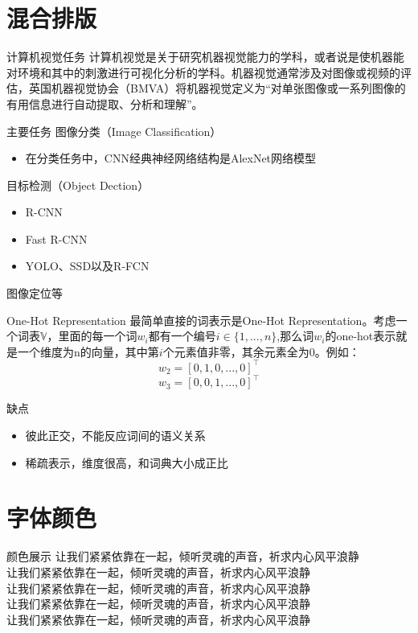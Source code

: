 \documentclass[10pt,aspectratio=43,mathserif,table]{beamer}
\begin{document}
\section{混合排版}  
\begin{frame}{计算机视觉任务}
	计算机视觉是关于研究机器视觉能力的学科，或者说是使机器能对环境和其中的刺激进行可视化分析的学科。机器视觉通常涉及对图像或视频的评估，英国机器视觉协会（BMVA）将机器视觉定义为“对单张图像或一系列图像的有用信息进行自动提取、分析和理解”。
\begin{block}{主要任务}
	图像分类（Image Classification）
	\begin{itemize}
		\item<0-> 在分类任务中，CNN经典神经网络结构是AlexNet网络模型
	\end{itemize}
	目标检测（Object Dection）
	\begin{itemize}
		\item<0-> R-CNN
		\item<0-> Fast R-CNN
		\item<0-> YOLO、SSD以及R-FCN
	\end{itemize}
	图像定位等
\end{block}
\end{frame}

\begin{frame}{One-Hot Representation}
最简单直接的词表示是One-Hot Representation。考虑一个词表$ \mathbb V $，里面的每一个词$ w_i $都有一个编号$ i\in \{1,...,n\} $,那么词$ w_i $的one-hot表示就是一个维度为n的向量，其中第$ i $个元素值非零，其余元素全为0。例如：
\[  w_2=[0,1,0,...,0]^\top  \]
\[  w_3=[0,0,1,...,0]^\top  \]
\begin{block}{缺点}
	\begin{itemize}
		\item<0-> 彼此正交，不能反应词间的语义关系
		\item<0-> 稀疏表示，维度很高，和词典大小成正比
	\end{itemize}
\end{block}
\end{frame}

\section{字体颜色}
\begin{frame}{颜色展示}
	\textcolor{mygray}{让我们紧紧依靠在一起，倾听灵魂的声音，祈求内心风平浪静}\\
	\textcolor{mygreen}{让我们紧紧依靠在一起，倾听灵魂的声音，祈求内心风平浪静}\\
	\textcolor{mypink}{让我们紧紧依靠在一起，倾听灵魂的声音，祈求内心风平浪静}\\
	\textcolor{mycyan}{让我们紧紧依靠在一起，倾听灵魂的声音，祈求内心风平浪静}\\
	\textcolor{mymauve}{让我们紧紧依靠在一起，倾听灵魂的声音，祈求内心风平浪静}
\end{frame}
\end{document}
